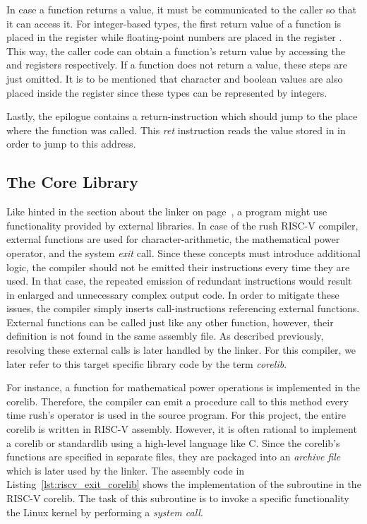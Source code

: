 In case a function returns a value, it must be communicated to the caller so that it can access it.
For integer-based types, the first return value of a function is placed in the register 
while floating-point numbers are placed in the register .
This way, the caller code can obtain a function's return value by accessing the  and 
registers respectively. If a function does not return a value, these steps are just omitted.
It is to be mentioned that character and boolean values are also placed inside the  register since these types can be represented by integers.

Lastly, the epilogue contains a return-instruction which should jump to the place where the function was called.
This \emph{ret} instruction reads the value stored in  in order to jump to this address.

\subsection{The Core Library}

Like hinted in the section about the linker on page~\pageref{sec:linker},
a program might use functionality provided by external libraries.
In case of the rush RISC-V compiler, external functions are used for character-arithmetic,
the mathematical power operator, and the system \emph{exit} call.
Since these concepts must introduce additional logic, the compiler should not be emitted their instructions every time they are used.
In that case, the repeated emission of redundant instructions would result in enlarged and unnecessary complex output code.
In order to mitigate these issues, the compiler simply inserts call-instructions referencing external functions.
External functions can be called just like any other function, however, their definition is not found in the same assembly file.
As described previously, resolving these external calls is later handled by the linker.
For this compiler, we later refer to this target specific library code by the term \emph{corelib}.

For instance, a function for mathematical power operations is implemented in the corelib.
Therefore, the compiler can emit a procedure call to this method every time rush's \qVerb{**} operator is used in the source program.
For this project, the entire corelib is written in RISC-V assembly.
However, it is often rational to implement a corelib or standardlib using a high-level language like C.
Since the corelib's functions are specified in separate files, they are packaged into an \emph{archive file} which is later used by the linker.
The assembly code in Listing~\ref{lst:riscv_exit_corelib} shows the implementation of the  subroutine in the RISC-V corelib.
The task of this subroutine is to invoke a specific functionality the Linux kernel by performing a \emph{system call}.

